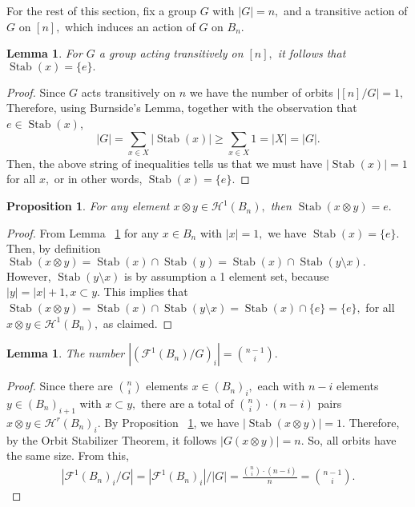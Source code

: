 \documentclass{amsart}
\newtheorem{lem}[thm]{Lemma}
\newtheorem{prop}[thm]{Proposition}
\theoremstyle{remark}
\newcommand\fbn{\mathcal H}
\def\Stab{\operatorname{Stab}}
\begin{document}
For the rest of this section, fix a group $G$ with $|G| = n,$ and a transitive action of $G$ on $[n],$ which induces an action of $G$ on $B_n.$

\begin{lem}
\label{lem:stabilizer_one}
For $G$ a group acting transitively on $[n],$ it follows that $\Stab(x) = \{e\}.$
\end{lem}
\begin{proof}
Since $G$ acts transitively on $n$ we have the number of orbits $|[n]/G| = 1,$ Therefore, using Burnside's Lemma, together with the observation that $e \in \Stab(x)$,
$$|G| = \sum_{x\in X}|\Stab(x)|\geq \sum_{x \in X} 1=|X|= |G|.$$
Then, the above string of inequalities tells us that we must have $|\Stab(x)| = 1$ for all $x,$ or in other words, $\Stab(x) = \{e\}.$
\end{proof}

\begin{prop}
\label{prop:stabilizer_edge}
For any element $x \otimes y \in \fbn^1(B_n),$ then $\Stab(x\otimes y) = e.$
\end{prop}
\begin{proof}
From Lemma ~\ref{lem:stabilizer_one} for any $x \in B_n$ with $|x| = 1,$ we have $\Stab(x) = \{e\}.$ Then, by definition $\Stab(x\otimes y) = \Stab(x) \cap \Stab(y) = \Stab(x) \cap \Stab(y \setminus x).$ However, $\Stab(y \setminus x)$ is by assumption a 1 element set, because $|y| = |x| +1,x \subset y.$ This implies that $\Stab(x\otimes y)=\Stab(x) \cap \Stab(y \setminus x) = \Stab(x) \cap \{e\} = \{e\},$ for all $x \otimes y \in \fbn^1(B_n),$ as claimed.
\end{proof}

\begin{lem}
\label{lem:q_counts}
The number $|(\mathcal F^1(B_n)/G)_i| = \binom{n-1}{i}.$
\end{lem}
\begin{proof}
Since there are $\binom{n}{i}$ elements $x\in(B_n)_i,$ each with $n-i$ elements $y \in (B_n)_{i+1}$ with $x \subset y,$ there are a total of $\binom{n}{i}\cdot (n-i)$ pairs $x \otimes y \in \fbn^r(B_n)_i.$ By Proposition ~\ref{prop:stabilizer_edge}, we have $|\Stab(x \otimes y)| = 1.$ Therefore, by the Orbit Stabilizer Theorem, it follows $|G(x\otimes y)| = n.$ So, all orbits have the same size. From this,
\begin{align*}
|\mathcal F^1(B_n)_i/G| = |\mathcal F^1(B_n)_i|/|G| = \frac{\binom{n}{i}\cdot (n-i)}{n} = \binom {n-1}{i}.
\end{align*}
\end{proof}
\end{document}

